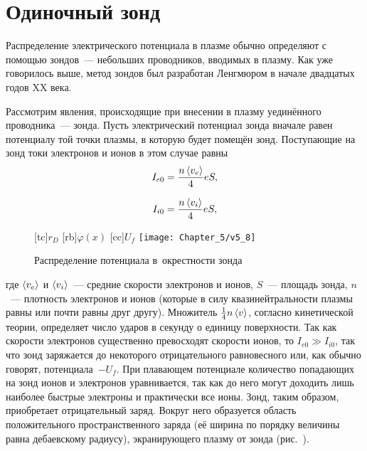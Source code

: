\section{Одиночный зонд}

Распределение электрического потенциала в плазме обычно определяют с помощью
зондов~--- небольших проводников, вводимых в
плазму. Как уже говорилось выше, метод зондов был разработан Ленгмюром в начале
двадцатых годов XX века.

Рассмотрим явления, происходящие при внесении в плазму уединённого
проводника~--- зонда. Пусть электрический потенциал
зонда вначале равен потенциалу той точки плазмы, в которую будет помещён зонд.
Поступающие на зонд токи электронов и
ионов в этом случае равны
\begin{equation}
	\eqmark{5.24}
	I_{e0}=\frac{n\average{v_e}}{4}eS,
\end{equation}

\begin{equation}
	\eqmark{5.25}
	I_{i0}=\frac{n\average{v_i}}{4}eS,
\end{equation}
\begin{wrapfigure}{o}{0.5\textwidth}
	[tc]{$r_D$}
	[rb]{$\varphi(x)$}
	[cc]{$U_f$}
	\texttt{[image: Chapter\_5/v5\_8]}
	\caption{Распределение потенциала в~окрестности зонда}
\end{wrapfigure}
где $\left< v_e \right>$ и $\left< v_i \right>$~--- средние скорости электронов и ионов,
$S$~--- площадь зонда, $n$~--- плотность
электронов и ионов (которые в силу квазинейтральности плазмы равны или почти
равны друг другу). Множитель $\frac{1}{4}
n\left< v \right>$, согласно кинетической теории, определяет число ударов в секунду о
единицу поверхности. Так как скорости
электронов существенно превосходят скорости ионов, то $I_{e0}\gg I_{i0}$, так
что зонд заряжается до некоторого
отрицательного равновесного или, как обычно говорят, 
потенциала~$-U_f$. При плавающем потенциале
количество попадающих на зонд ионов и электронов уравнивается, так как до него
могут доходить лишь наиболее быстрые
электроны и практически все ионы. Зонд, таким образом, приобретает отрицательный
заряд. Вокруг него образуется область
положительного пространственного заряда (её ширина по порядку величины равна
дебаевскому радиусу), экранирующего плазму
от зонда (рис.~).

